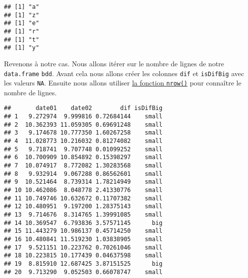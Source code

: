 \documentclass[]{book}
\newenvironment{Shaded}{\begin{snugshade}}{\end{snugshade}}
\newcommand{\KeywordTok}[1]{\textcolor[rgb]{0.13,0.29,0.53}{\textbf{#1}}}
\newcommand{\DataTypeTok}[1]{\textcolor[rgb]{0.13,0.29,0.53}{#1}}
\newcommand{\DecValTok}[1]{\textcolor[rgb]{0.00,0.00,0.81}{#1}}
\newcommand{\StringTok}[1]{\textcolor[rgb]{0.31,0.60,0.02}{#1}}
\newcommand{\OtherTok}[1]{\textcolor[rgb]{0.56,0.35,0.01}{#1}}
\newcommand{\ControlFlowTok}[1]{\textcolor[rgb]{0.13,0.29,0.53}{\textbf{#1}}}
\newcommand{\OperatorTok}[1]{\textcolor[rgb]{0.81,0.36,0.00}{\textbf{#1}}}
\newcommand{\NormalTok}[1]{#1}
\theoremstyle{definition}
\theoremstyle{definition}
\theoremstyle{definition}
\theoremstyle{remark}
\begin{document}
\begin{verbatim}
## [1] "a"
## [1] "z"
## [1] "e"
## [1] "r"
## [1] "t"
## [1] "y"
\end{verbatim}

Revenons à notre cas. Nous allons itérer sur le nombre de lignes de
notre \texttt{data.frame} \texttt{bdd}. Avant cela nous allons créer les
colonnes \texttt{dif} et \texttt{isDifBig} avec les valeurs \texttt{NA}.
Ensuite nous allons utiliser \protect\hyperlink{l015nrow}{la fonction
\texttt{nrow()}} pour connaître le nombre de lignes.

\begin{Shaded}
\end{Shaded}

\begin{verbatim}
##       date01    date02        dif isDifBig
## 1   9.272974  9.999816 0.72684144    small
## 2  10.362393 11.059305 0.69691248    small
## 3   9.174678 10.777350 1.60267258    small
## 4  11.028773 10.216032 0.81274082    small
## 5   9.718741  9.707748 0.01099252    small
## 6  10.700909 10.854892 0.15398297    small
## 7  10.074917  8.772082 1.30283568    small
## 8   9.932914  9.067288 0.86562601    small
## 9  10.521464  8.739314 1.78214949    small
## 10 10.462086  8.048778 2.41330776    small
## 11 10.749746 10.632672 0.11707382    small
## 12 10.480951  9.197200 1.28375143    small
## 13  9.714676  8.314765 1.39991085    small
## 14 10.369547  6.793836 3.57571145      big
## 15 11.443279 10.986137 0.45714250    small
## 16 10.480841 11.519230 1.03838905    small
## 17  9.521151 10.223762 0.70261046    small
## 18 10.223815 10.177439 0.04637598    small
## 19  8.815910 12.687425 3.87151525      big
## 20  9.713290  9.052503 0.66078747    small
\end{verbatim}
\end{document}
